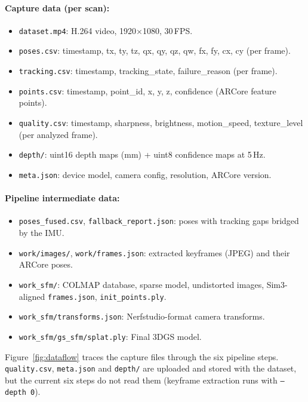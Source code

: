 \paragraph{Capture data (per scan):}
\begin{itemize}
    \item \texttt{dataset.mp4}: H.264 video, 1920$\times$1080, 30\,FPS.
    \item \texttt{poses.csv}: timestamp, tx, ty, tz, qx, qy, qz, qw, fx, fy, cx, cy (per frame).
    \item \texttt{tracking.csv}: timestamp, tracking\_state, failure\_reason (per frame).
    \item \texttt{points.csv}: timestamp, point\_id, x, y, z, confidence (ARCore feature points).
    \item \texttt{quality.csv}: timestamp, sharpness, brightness, motion\_speed, texture\_level (per analyzed frame).
    \item \texttt{depth/}: uint16 depth maps (mm) + uint8 confidence maps at 5\,Hz.
    \item \texttt{meta.json}: device model, camera config, resolution, ARCore version.
\end{itemize}

\paragraph{Pipeline intermediate data:}
\begin{itemize}
    \item \texttt{poses\_fused.csv}, \texttt{fallback\_report.json}: poses with tracking gaps bridged by the IMU.
    \item \texttt{work/images/}, \texttt{work/frames.json}: extracted keyframes (JPEG) and their ARCore poses.
    \item \texttt{work\_sfm/}: COLMAP database, sparse model, undistorted images, Sim3-aligned \texttt{frames.json}, \texttt{init\_points.ply}.
    \item \texttt{work\_sfm/transforms.json}: Nerfstudio-format camera transforms.
    \item \texttt{work\_sfm/gs\_sfm/splat.ply}: Final 3DGS model.
\end{itemize}

Figure~\ref{fig:dataflow} traces the capture files through the six pipeline steps. \texttt{quality.csv}, \texttt{meta.json} and \texttt{depth/} are uploaded and stored with the dataset, but the current six steps do not read them (keyframe extraction runs with \texttt{--depth 0}).

